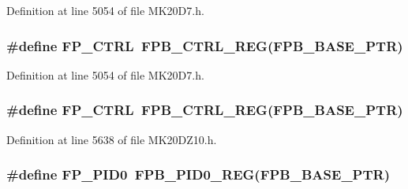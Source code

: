 Definition at line 5054 of file M\+K20\+D7.\+h.

\subsubsection[{\texorpdfstring{F\+P\+\_\+\+C\+T\+RL}{FP_CTRL}}]{\setlength{\rightskip}{0pt plus 5cm}\#define F\+P\+\_\+\+C\+T\+RL~{\bf F\+P\+B\+\_\+\+C\+T\+R\+L\+\_\+\+R\+EG}({\bf F\+P\+B\+\_\+\+B\+A\+S\+E\+\_\+\+P\+TR})}\hypertarget{group___f_p_b___register___accessor___macros_ga23de55de0fdb50910ba8ab05e187e568}{}\label{group___f_p_b___register___accessor___macros_ga23de55de0fdb50910ba8ab05e187e568}


Definition at line 5054 of file M\+K20\+D7.\+h.

\subsubsection[{\texorpdfstring{F\+P\+\_\+\+C\+T\+RL}{FP_CTRL}}]{\setlength{\rightskip}{0pt plus 5cm}\#define F\+P\+\_\+\+C\+T\+RL~{\bf F\+P\+B\+\_\+\+C\+T\+R\+L\+\_\+\+R\+EG}({\bf F\+P\+B\+\_\+\+B\+A\+S\+E\+\_\+\+P\+TR})}\hypertarget{group___f_p_b___register___accessor___macros_ga23de55de0fdb50910ba8ab05e187e568}{}\label{group___f_p_b___register___accessor___macros_ga23de55de0fdb50910ba8ab05e187e568}


Definition at line 5638 of file M\+K20\+D\+Z10.\+h.

\subsubsection[{\texorpdfstring{F\+P\+\_\+\+P\+I\+D0}{FP_PID0}}]{\setlength{\rightskip}{0pt plus 5cm}\#define F\+P\+\_\+\+P\+I\+D0~{\bf F\+P\+B\+\_\+\+P\+I\+D0\+\_\+\+R\+EG}({\bf F\+P\+B\+\_\+\+B\+A\+S\+E\+\_\+\+P\+TR})}\hypertarget{group___f_p_b___register___accessor___macros_ga8e0747f228e5fad0edcf470d86723339}{}\label{group___f_p_b___register___accessor___macros_ga8e0747f228e5fad0edcf470d86723339}


